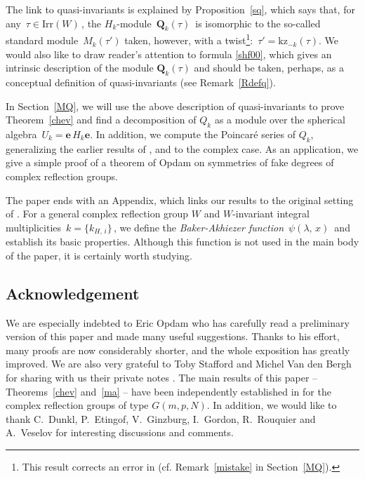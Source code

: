 \documentclass{amsart}
\theoremstyle{definition}
\theoremstyle{remark}
\numberwithin{equation}{section}
\begin{document}
The link to quasi-invariants is explained by Proposition~\ref{sq},
which says that, for any $\,\tau \in {\mathrm{Irr}(W)} \,$, the $H_k$-module
$\,{\mathbf{Q}}_k(\tau)\,$ is isomorphic to the so-called standard module
$\, M_k(\tau')$ taken, however, with a twist\footnote{This result corrects an error in \cite{BEG} (cf. Remark~\ref{mistake} in Section~\ref{MQ}).}: $\,\tau' ={\mathrm{kz}}_{-k}(\tau)$.
We would also like to draw reader's attention to formula \eqref{shf00},
which gives an intrinsic description of the module $ {\mathbf{Q}}_k(\tau) $ and should be taken,
perhaps, as a conceptual definition of quasi-invariants (see Remark~\ref{Rdefq}).

In Section~\ref{MQ}, we will use the above description of quasi-invariants
to prove Theorem~\ref{chev} and find a decomposition of $ Q_k $ as a module over the spherical algebra
$\,U_k= {\boldsymbol{e}}\,H_k{\boldsymbol{e}}$. In addition, we compute the Poincar\'e series of $Q_k$,
generalizing the earlier results of \cite{FV1}, \cite{EG1} and \cite{BEG} to the complex case.
As an application, we give a simple proof of a theorem of Opdam on symmetries of
fake degrees of complex reflection groups.

The paper ends with an Appendix, which links our results to the original setting of \cite{CV90}. For a general complex reflection group $W$ and $W$-invariant integral multiplicities $\, k = \{k_{H, \,i}\}\,$, we define the {\it Baker-Akhiezer function} $\,\psi(\lambda,\,x)\,$ and establish its basic properties. Although this function is not used
in the main body of the paper, it is certainly worth studying.

\subsection*{Acknowledgement}
We are especially indebted to Eric Opdam who has carefully read a preliminary version of this paper
and made many useful suggestions. Thanks to his effort, many proofs are now considerably shorter,
and the whole exposition has greatly improved.
We are also very grateful to Toby Stafford and Michel Van den Bergh for sharing with us their private notes \cite{SvdB}. The main results of this paper -- Theorems~\ref{chev} and~\ref{ma} -- have been independently established in \cite{SvdB} for the complex reflection groups of type $ G(m,p,N) $. In addition, we would like to thank C.~Dunkl, P.~Etingof, V.~Ginzburg, I.~Gordon, R.~Rouquier and A.~Veselov for interesting discussions and comments.
\end{document}

